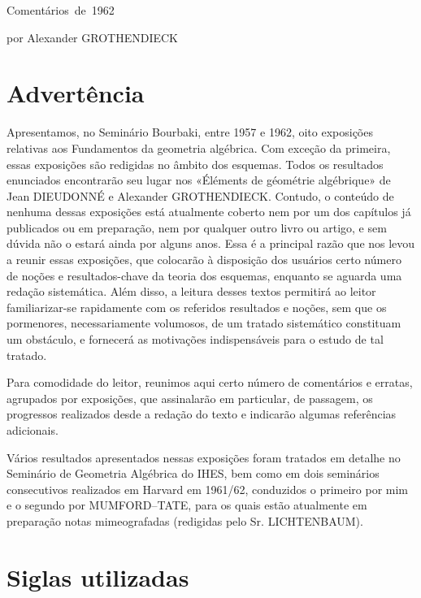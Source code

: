 \unit{Comentários de 1962}
%
  {por Alexander GROTHENDIECK}

\section*{Advertência}

Apresentamos, no Seminário Bourbaki, entre 1957 e 1962, oito exposições
relativas aos Fundamentos da geometria algébrica. Com exceção da primeira,
essas exposições são redigidas no âmbito dos esquemas. Todos os resultados
enunciados encontrarão seu lugar nos «Éléments de géométrie algébrique» de Jean
DIEUDONNÉ e Alexander GROTHENDIECK. Contudo, o conteúdo de nenhuma dessas
exposições está atualmente coberto nem por um dos capítulos já publicados ou
em preparação, nem por qualquer outro livro ou artigo, e sem dúvida não o
estará ainda por alguns anos. Essa é a principal razão que nos levou a reunir
essas exposições, que colocarão à disposição dos usuários certo número de
noções e resultados-chave da teoria dos esquemas, enquanto se aguarda uma
redação sistemática. Além disso, a leitura desses textos permitirá ao leitor
familiarizar-se rapidamente com os referidos resultados e noções, sem que os
pormenores, necessariamente volumosos, de um tratado sistemático constituam
um obstáculo, e fornecerá as motivações indispensáveis para o estudo de tal
tratado.

Para comodidade do leitor, reunimos aqui certo número de comentários e
erratas, agrupados por exposições, que assinalarão em particular, de passagem,
os progressos realizados desde a redação do texto e indicarão algumas
referências adicionais.

Vários resultados apresentados nessas exposições foram tratados em detalhe no
Seminário de Geometria Algébrica do IHES, bem como em dois seminários
consecutivos realizados em Harvard em 1961/62, conduzidos o primeiro por mim e
o segundo por MUMFORD--TATE, para os quais estão atualmente em preparação
notas mimeografadas (redigidas pelo Sr. LICHTENBAUM).

\section*{Siglas utilizadas}

